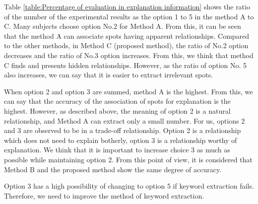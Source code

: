 \documentclass[journal]{IAENGtran}
\begin{document}
Table \ref{table:Percentage of evaluation in explanation information} shows the ratio of the number of the experimental results as the option 1 to 5 in the method A to C.
Many subjects choose option No.2 for Method A.
From this, it can be seen that the method A can associate spots having apparent relationships.
Compared to the other methods, in Method C (proposed method), the ratio of No.2 option decreases and the ratio of No.3 option increases.
From this, we think that method C finds and presents hidden relationships.
However, as the ratio of option No. 5 also increases, we can say that it is easier to extract irrelevant spots.

When option 2 and option 3 are summed, method A is the highest.
From this, we can say that the accuracy of the association of spots for explanation is the highest.
However, as described above, the meaning of option 2 is a natural relationship, and Method A can extract only a small number.
For us, options 2 and 3 are observed to be in a trade-off relationship.
Option 2 is a relationship which does not need to explain botherly, option 3 is a relationship worthy of explanation.
We think that it is important to increase choice 3 as much as possible while maintaining option 2.
From this point of view, it is considered that Method B and the proposed method show the same degree of accuracy.

Option 3 has a high possibility of changing to option 5 if keyword extraction fails.
Therefore, we need to improve the method of keyword extraction.
\end{document}
